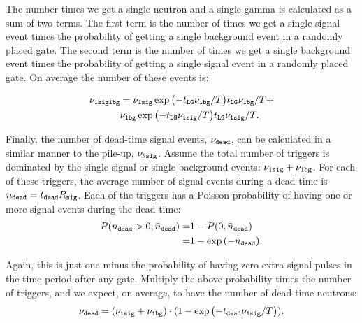 \documentclass[letter,twocolumn,preprint,3p,numbers,sort&compress]{elsarticle}
\begin{document}
The number times we get a single neutron and a single gamma is
calculated as a sum of two terms.  The first term is the number of
times we get a single signal event times the probability of getting a
single background event in a randomly placed gate.  The second term is
the number of times we get a single background event times the
probability of getting a single signal event in a randomly placed
gate.  On average the number of these events is:

\begin{align}
\nu_{\tt 1 sig 1 bg} &= 
           \nu_{\tt 1 sig} \exp{ \left( -t_{\tt LG} \nu_{\tt 1 bg} / T \right) } t_{\tt LG} \nu_{\tt 1 bg} / T + \nonumber \\
         & \nu_{\tt 1 bg} \exp{ \left( -t_{\tt LG} \nu_{\tt 1 sig} / T \right) } t_{\tt LG} \nu_{\tt 1 sig} /T.
\end{align}

Finally, the number of dead-time signal events, $\nu_{\tt dead}$, can
be calculated in a similar manner to the pile-up, $\nu_{\tt N sig}$.
Assume the total number of triggers is dominated by the single signal
or single background events: $\nu_{\tt 1 sig} + \nu_{\tt 1 bg}$.  For
each of these triggers, the average number of signal events during a
dead time is $\bar{n}_{\tt dead} = t_{\tt dead} R_{\tt sig}$.  Each of
the triggers has a Poisson probability of having one or more signal
events during the dead time:
\begin{align*}
P( n_{\tt dead} > 0, \bar{n}_{\tt dead} ) =& 1 -  P( 0, \bar{n}_{\tt dead} ) \nonumber \\
                                     =& 1 - \exp{ \left( -\bar{n}_{\tt dead} \right) } .
\end{align*}

Again, this is just one minus the probability of having zero extra
signal pulses in the time period after any gate.  Multiply the above
probability times the number of triggers, and we expect, on average,
to have the number of dead-time neutrons:
\begin{equation}\label{eq:dead}
\nu_{\tt dead} = (\nu_{\tt 1 sig} + \nu_{\tt 1 bg} ) \cdot 
         ( 1 - \exp{ \left( -t_{\tt dead} \nu_{\tt 1 sig} / T \right) } ).
\end{equation}
\end{document}
